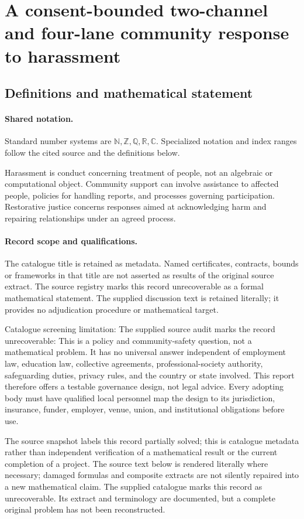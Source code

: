 \documentclass[11pt]{article}
\begin{document}
\section{A consent-bounded two-channel and four-lane community response to harassment}\label{statement}

\subsection{Definitions and mathematical statement}

\paragraph{Shared notation.}Standard number systems are $\mathbb N,\mathbb Z,\mathbb Q,\mathbb R,\mathbb C$. Specialized notation and index ranges follow the cited source and the definitions below.


Harassment is conduct concerning treatment of people, not an algebraic or computational object. Community support can involve assistance to affected people, policies for handling reports, and processes governing participation. Restorative justice concerns responses aimed at acknowledging harm and repairing relationships under an agreed process.
\paragraph{Record scope and qualifications.}
The catalogue title is retained as metadata. Named certificates, contracts, bounds or frameworks in that title are not asserted as results of the original source extract.
The source registry marks this record unrecoverable as a formal mathematical statement. The supplied discussion text is retained literally; it provides no adjudication procedure or mathematical target.

Catalogue screening limitation: The supplied source audit marks the record unrecoverable: This is a policy and community-safety question, not a mathematical problem. It has no universal answer independent of employment law, education law, collective agreements, professional-society authority, safeguarding duties, privacy rules, and the country or state involved. This report therefore offers a testable governance design, not legal advice. Every adopting body must have qualified local personnel map the design to its jurisdiction, insurance, funder, employer, venue, union, and institutional obligations before use.

The source snapshot labels this record partially solved; this is catalogue metadata rather than independent verification of a mathematical result or the current completion of a project.
The source text below is rendered literally where necessary; damaged formulas and composite extracts are not silently repaired into a new mathematical claim.
The supplied catalogue marks this record as unrecoverable. Its extract and terminology are documented, but a complete original problem has not been reconstructed.
\end{document}
